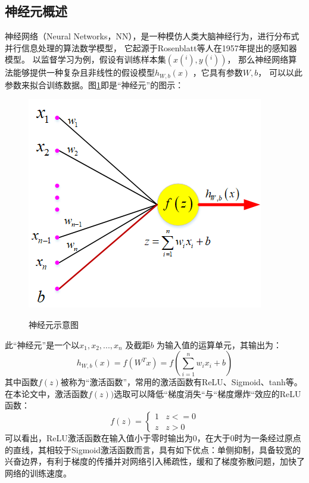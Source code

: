 \subsection{神经元概述}	
神经网络（Neural Networks，NN），是一种模仿人类大脑神经行为，进行分布式并行信息处理的算法数学模型，
它起源于Rosenblatt等人在1957年提出的感知器模型\cite{rosenblatt1958perceptron}。
以监督学习为例，假设有训练样本集$(x(^i), y(^i))$，
那么神经网络算法能够提供一种复杂且非线性的假设模型$h_{W,b}(x)$ ，它具有参数$W, b$，
可以以此参数来拟合训练数据。图\ref{fig_2_1}即是“神经元”的图示：\par
\begin{figure}[!h]
	\centering
	\includegraphics[scale=0.9]{figures/chapter_2/fig_2_1.png}\\
	\caption{神经元示意图}\label{fig_2_1}
\end{figure}
此“神经元”是一个以$x_1, x_2, ..., x_n$ 及截距$b$ 为输入值的运算单元，其输出为：
\begin{equation}
	h_{W,b}(x) = f(W^Tx) = f(\sum_{i=1}^n w_{i}x_i +b)
\end{equation} 
其中函数$f(z)$被称为“激活函数”，常用的激活函数有ReLU、Sigmoid、tanh等。在本论文中，激活函数$f(z))$选取可以降低``梯度消失``与``梯度爆炸``效应的ReLU函数：
\begin{equation}
	f(z) = 
	\begin{cases}
		1 & z <=0\\
		z & z > 0
	\end{cases}
\end{equation}
可以看出，ReLU激活函数在输入值小于零时输出为0，在大于0时为一条经过原点的直线，其相较于Sigmoid激活函数而言，具有如下优点：单侧抑制，具备较宽的兴奋边界，有利于梯度的传播并对网络引入稀疏性，缓和了梯度弥散问题，加快了网络的训练速度。\par
